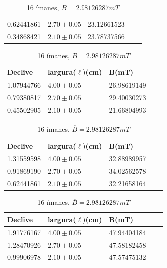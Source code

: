 \documentclass[11pt]{report}
\begin{document}
\begin{table}[!htb]
\begin{minipage}{.5\linewidth}
\begin{tabular}{lllll}
		0.62441861&$2.70\pm 0.05$  &23.12661523 \\
		0.34868421&$2.10\pm 0.05$  &23.78737566   \\ \hline
	        \end{tabular}
	    \end{minipage}%
			\vspace{\belowdisplayskip}
			\vspace{\abovedisplayskip}
	    \begin{minipage}{.5\linewidth}
	      \centering
				\caption{10 ímanes, $\overline{B} = 2.60181814 mT$}
	        \begin{tabular}{lllll}
		\hline
		Declive        & largura($\ell$)(cm)     & B(mT)           \\ \hline
		1.07944766 &$4.00\pm 0.05$  &26.98619149  \\
		0.79380817&$2.70\pm 0.05$   &29.40030273 \\
		0.45502905&$2.10\pm 0.05$  &21.66804993   \\ \hline
	        \end{tabular}
	    \end{minipage}
			\vspace{\belowdisplayskip}
			 \vspace{\abovedisplayskip}
	    \begin{minipage}{.5\linewidth}
	      \centering
				\caption{12 ímanes, $\overline{B} = 2.68471514 mT$}
	        \begin{tabular}{lllll}
		\hline
		Declive        & largura($\ell$)(cm)     & B(mT)          \\ \hline
		1.31559598 &$4.00\pm 0.05$  &32.88989957  \\
		0.91869190&$2.70\pm 0.05$     &34.02562578 \\
		0.62441861&$2.10\pm 0.05$   &32.21658164   \\ \hline
	        \end{tabular}
	    \end{minipage}%
			\vspace{\belowdisplayskip}
			\vspace{\abovedisplayskip}
	    \begin{minipage}{.5\linewidth}
	      \centering
				\caption{16 ímanes, $\overline{B} = 2.98126287 mT$}
	        \begin{tabular}{lllll}
		\hline
		Declive        & largura($\ell$)(cm)     & B(mT)           \\ \hline
		1.91776167 &$4.00\pm 0.05$   &47.94404184  \\
		1.28470926&$2.70\pm 0.05$   &47.58182458 \\
		0.99906978&$2.10\pm 0.05$   &47.57475132   \\ \hline
	        \end{tabular}
	    \end{minipage}
	\end{table}
\end{document}
